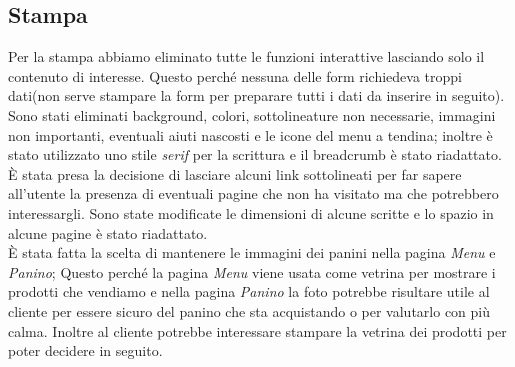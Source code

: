 \subsection{Stampa}
Per la stampa abbiamo eliminato tutte le funzioni interattive lasciando solo il contenuto di interesse.
Questo perché nessuna delle form richiedeva troppi dati(non serve stampare la form per preparare tutti i dati da inserire in seguito).\\
Sono stati eliminati background, colori, sottolineature non necessarie, immagini non importanti, eventuali aiuti nascosti e le icone del menu a tendina;
inoltre è stato utilizzato uno stile \emph{serif} per la scrittura e il breadcrumb è stato riadattato.\\
È stata presa la decisione di lasciare alcuni link sottolineati per far sapere all'utente la presenza di eventuali pagine che non ha visitato ma che potrebbero interessargli.
Sono state modificate le dimensioni di alcune scritte e lo spazio in alcune pagine è stato riadattato.\\
È stata fatta la scelta di mantenere le immagini dei panini nella pagina \emph{Menu} e \emph{Panino}; 
Questo perché la pagina \emph{Menu} viene usata come vetrina per mostrare i prodotti che vendiamo e nella pagina \emph{Panino} la foto potrebbe risultare utile al cliente per essere sicuro del panino che sta acquistando o per valutarlo con più calma.
Inoltre al cliente potrebbe interessare stampare la vetrina dei prodotti per poter decidere in seguito.\\